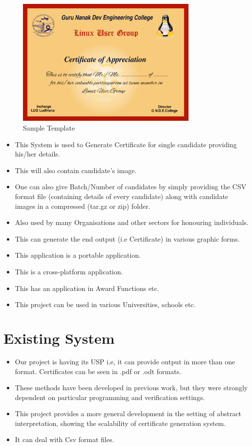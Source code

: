 \begin{figure}[!ht]
\centering
\includegraphics[width=0.8\textwidth]{images/template.jpg}                   
\caption{Sample Template}
\hspace{-1.5em}
\end{figure}
\begin{itemize}
\item This System is used to Generate Certificate for single candidate providing his/her details.
\item This will also contain candidate's image. 
\item One can also give Batch/Number of candidates by simply providing the CSV format file (containing details of every candidate) along with candidate images in a compressed (tar.gz or zip) folder.
\item Also used by many Organisations and other sectors for honouring individuals.
\item This can generate the end output (i.e Certificate) in various graphic forms.
\item This application is a portable application.
\item This is a cross-platform application.
\item This has an application in Award Functions etc.
\item This project can be used in various Universities, schools etc.
\end{itemize}
\newpage
\section{Existing System}
\begin{itemize}
\item Our project is having its USP i.e, it can provide output in more than one format. Certificates can be seen in .pdf or .odt formats.
\item These methods have been developed in previous work, but they were strongly dependent on particular programming and verification settings. 
\item This project provides a more general development in the setting of abstract interpretation, showing the scalability of
certificate generation system.
\item It can deal with Csv format files.
\end{itemize}
